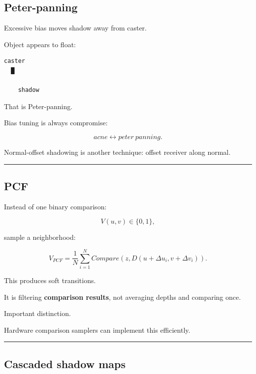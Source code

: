 \subsection{Peter-panning}\label{04-visual-computing-ii-ch040-peter-panning}

\hypertarget{04-visual-computing-ii-ch040-peter-panning}{}

Excessive bias moves shadow away from caster.

Object appears to float:

\begin{verbatim}
caster
  █

    shadow
\end{verbatim}

That is Peter-panning.

Bias tuning is always compromise:

\[
acne
\leftrightarrow
peter\ panning.
\]

Normal-offset shadowing is another technique: offset receiver along normal.

\begin{center}\rule{0.5\linewidth}{0.5pt}\end{center}

\subsection{PCF}\label{04-visual-computing-ii-ch040-pcf}

\hypertarget{04-visual-computing-ii-ch040-pcf}{}

Instead of one binary comparison:

\[
V(u,v)\in\{0,1\},
\]

sample a neighborhood:

\[
\boxed{
V_{PCF}
=
\frac1N
\sum_{i=1}^{N}
Compare(
z,
D(u+\Delta u_i,v+\Delta v_i)
).
}
\]

This produces soft transitions.

It is filtering \textbf{comparison results}, not averaging depths and comparing once.

Important distinction.

Hardware comparison samplers can implement this efficiently.

\begin{center}\rule{0.5\linewidth}{0.5pt}\end{center}

\subsection{Cascaded shadow maps}\label{04-visual-computing-ii-ch040-cascaded-shadow-maps}

